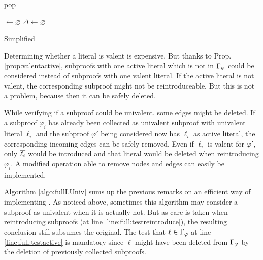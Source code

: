 \documentclass{llncs}
\begin{document}
\begin{algorithm}[bt]
  \BlankLine

   {pop}

  \Univ $\leftarrow \varnothing$ \;
  $\Delta \leftarrow \varnothing$ \;
  \BlankLine

  \BlankLine


  \caption{Simplified \LowerUnivalents}
  \label{algo:LUniv}
\end{algorithm}

Determining whether a literal is valent is expensive. But thanks to Prop. \ref{prop:valentactive},
subproofs with one active literal which is not in $\Gamma_{\psi}$ could be considered instead
of subproofs with one valent literal.  If the active literal is not valent, the corresponding
subproof might not be reintroduceable. But this is not a problem, because then it can be safely deleted.

While verifying if a subproof could be univalent, some edges might be deleted. If a
subproof $\varphi_i$ has already been collected as univalent subproof with univalent literal
$\ell_i$ and the subproof $\varphi'$ being considered now has $\ell_i$ as active literal, the
corresponding incoming edges can be safely removed. Even if $\ell_i$ is valent for $\varphi'$, only
$\overline{\ell_i}$ would be introduced and that literal would be deleted when reintroducing
$\varphi_i$. A modified  operation able to remove nodes and edges can easily be
implemented.

Algorithm \ref{algo:fullLUniv} sums up the previous remarks on an efficient way of implementing
{\LowerUnivalents}. As noticed above, sometimes this algorithm may consider a subproof as univalent when it
is actually not. But as care is taken when reintroducing subproofs (at line \ref{line:full:testreintroduce}),
the resulting conclusion still subsumes the original.  The test that $\ell \in \Gamma_{\varphi}$
at line \ref{line:full:testactive} is mandatory since $\ell$ might have been deleted from
$\Gamma_{\varphi}$ by the deletion of previously collected subproofs.
\end{document}
